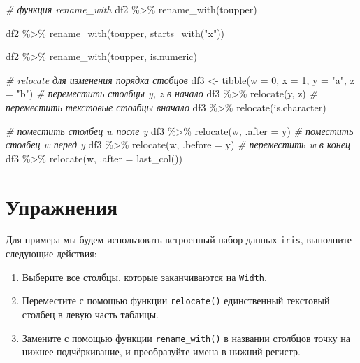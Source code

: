 \documentclass[
]{book}
\newenvironment{Shaded}{\begin{snugshade}}{\end{snugshade}}
\newcommand{\AttributeTok}[1]{\textcolor[rgb]{0.77,0.63,0.00}{#1}}
\newcommand{\CommentTok}[1]{\textcolor[rgb]{0.56,0.35,0.01}{\textit{#1}}}
\newcommand{\DecValTok}[1]{\textcolor[rgb]{0.00,0.00,0.81}{#1}}
\newcommand{\FunctionTok}[1]{\textcolor[rgb]{0.00,0.00,0.00}{#1}}
\newcommand{\NormalTok}[1]{#1}
\newcommand{\OtherTok}[1]{\textcolor[rgb]{0.56,0.35,0.01}{#1}}
\newcommand{\SpecialCharTok}[1]{\textcolor[rgb]{0.00,0.00,0.00}{#1}}
\newcommand{\StringTok}[1]{\textcolor[rgb]{0.31,0.60,0.02}{#1}}
\providecommand{\tightlist}{%
  \setlength{\itemsep}{0pt}\setlength{\parskip}{0pt}}
\begin{document}
\begin{Shaded}
\begin{Highlighting}[]
\CommentTok{\# функция rename\_with}
\NormalTok{df2 }\SpecialCharTok{\%\textgreater{}\%} \FunctionTok{rename\_with}\NormalTok{(toupper)}

\NormalTok{df2 }\SpecialCharTok{\%\textgreater{}\%} \FunctionTok{rename\_with}\NormalTok{(toupper, }\FunctionTok{starts\_with}\NormalTok{(}\StringTok{"x"}\NormalTok{))}

\NormalTok{df2 }\SpecialCharTok{\%\textgreater{}\%} \FunctionTok{rename\_with}\NormalTok{(toupper, is.numeric)}


\CommentTok{\# relocate для изменения порядка стобцов}
\NormalTok{df3 }\OtherTok{\textless{}{-}} \FunctionTok{tibble}\NormalTok{(}\AttributeTok{w =} \DecValTok{0}\NormalTok{, }\AttributeTok{x =} \DecValTok{1}\NormalTok{, }\AttributeTok{y =} \StringTok{"a"}\NormalTok{, }\AttributeTok{z =} \StringTok{"b"}\NormalTok{)}
\CommentTok{\# переместить столбцы y, z в начало}
\NormalTok{df3 }\SpecialCharTok{\%\textgreater{}\%} \FunctionTok{relocate}\NormalTok{(y, z)}
\CommentTok{\# переместить текстовые столбцы вначало}
\NormalTok{df3 }\SpecialCharTok{\%\textgreater{}\%} \FunctionTok{relocate}\NormalTok{(is.character)}

\CommentTok{\# поместить столбец w после y}
\NormalTok{df3 }\SpecialCharTok{\%\textgreater{}\%} \FunctionTok{relocate}\NormalTok{(w, }\AttributeTok{.after =}\NormalTok{ y)}
\CommentTok{\# поместить столбец w перед y}
\NormalTok{df3 }\SpecialCharTok{\%\textgreater{}\%} \FunctionTok{relocate}\NormalTok{(w, }\AttributeTok{.before =}\NormalTok{ y)}
\CommentTok{\# переместить w в конец}
\NormalTok{df3 }\SpecialCharTok{\%\textgreater{}\%} \FunctionTok{relocate}\NormalTok{(w, }\AttributeTok{.after =} \FunctionTok{last\_col}\NormalTok{())}
\end{Highlighting}
\end{Shaded}

\hypertarget{ux443ux43fux440ux430ux436ux43dux435ux43dux438ux44f}{%
\section{Упражнения}\label{ux443ux43fux440ux430ux436ux43dux435ux43dux438ux44f}}

Для примера мы будем использовать встроенный набор данных \texttt{iris}, выполните следующие действия:

\begin{enumerate}
\def\labelenumi{\arabic{enumi}.}
\tightlist
\item
  Выберите все столбцы, которые заканчиваются на \texttt{Width}.
\item
  Переместите с помощью функции \texttt{relocate()} единственный текстовый столбец в левую часть таблицы.
\item
  Замените с помощью функции \texttt{rename\_with()} в названии столбцов точку на нижнее подчёркивание, и преобразуйте имена в нижний регистр.
\end{enumerate}
\end{document}
